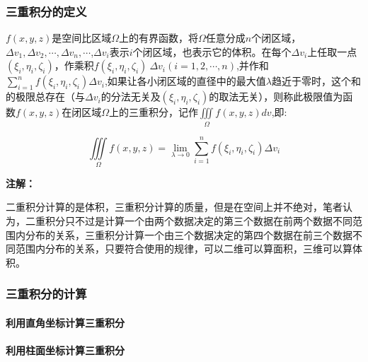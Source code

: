 \documentclass[
]{article}
\begin{document}
\hypertarget{ux4e09ux91cdux79efux5206ux7684ux5b9aux4e49}{%
\subsubsection{三重积分的定义}\label{ux4e09ux91cdux79efux5206ux7684ux5b9aux4e49}}

\(f(x,y,z)\)是空间比区域\(\Omega\)上的有界函数，将\(\Omega\)任意分成\(n\)个闭区域，\(\Delta v_1,\Delta v_2,\cdots,\Delta v_n,\cdots\),\(\Delta v_i\)表示\(i\)个闭区域，也表示它的体积。在每个\(\Delta v_i\)上任取一点\((\xi_i,\eta_i,\zeta_i)\)，作乘积\(f(\xi_i,\eta_i,\zeta_i) \ \Delta v_i(i=1,2,\cdots,n)\),并作和\(\sum \limits _{i=1} ^{n}f(\xi_i,\eta_i,\zeta_i)\Delta v_i\),如果让各小闭区域的直径中的最大值\(\lambda\)趋近于零时，这个和的极限总存在（与\(\Delta v_i\)的分法无关及\((\xi_i,\eta_i,\zeta_i)\)的取法无关），则称此极限值为函数\(f(x,y,z)\)在闭区域\(\Omega\)上的三重积分，记作\(\iiint\limits_\Omega f(x,y,z) dv\),即:

\[\iiint\limits_\Omega f(x,y,z) = \lim \limits _{\lambda \to 0} \sum\limits_{i=1}^n f(\xi_i,\eta_i,\zeta_i)\Delta v_i\]

\textbf{注解：}

二重积分计算的是体积，三重积分计算的质量，但是在空间上并不绝对，笔者认为，二重积分只不过是计算一个由两个数据决定的第三个数据在前两个数据不同范围内分布的关系，三重积分计算一个由三个数据决定的第四个数据在前三个数据不同范围内分布的关系，只要符合使用的规律，可以二维可以算面积，三维可以算体积。

\hypertarget{ux4e09ux91cdux79efux5206ux7684ux8ba1ux7b97}{%
\subsubsection{三重积分的计算}\label{ux4e09ux91cdux79efux5206ux7684ux8ba1ux7b97}}

\hypertarget{ux5229ux7528ux76f4ux89d2ux5750ux6807ux8ba1ux7b97ux4e09ux91cdux79efux5206}{%
\paragraph{利用直角坐标计算三重积分}\label{ux5229ux7528ux76f4ux89d2ux5750ux6807ux8ba1ux7b97ux4e09ux91cdux79efux5206}}

\hypertarget{ux5229ux7528ux67f1ux9762ux5750ux6807ux8ba1ux7b97ux4e09ux91cdux79efux5206}{%
\paragraph{利用柱面坐标计算三重积分}\label{ux5229ux7528ux67f1ux9762ux5750ux6807ux8ba1ux7b97ux4e09ux91cdux79efux5206}}
\end{document}
